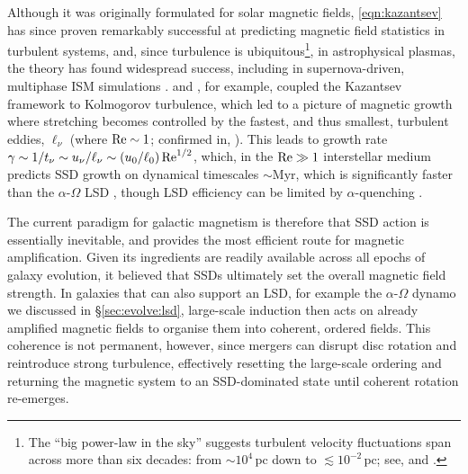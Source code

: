 Although it was originally formulated for solar magnetic fields, \autoref{eqn:kazantsev} has since proven remarkably successful at predicting magnetic field statistics in turbulent systems, and, since turbulence is ubiquitous\footnote{
    The ``big power-law in the sky'' suggests turbulent velocity fluctuations span across more than six decades: from $\sim 10^4\,\mathrm{pc}$ down to $\lesssim 10^{-2}\,\mathrm{pc}$; see, \eg \citet{kalberla2019turbulent} and \citet{liu2025tiny}.
}, in astrophysical plasmas, the theory has found widespread success, including in supernova-driven, multiphase ISM simulations \citep{gent2023transition}. \citet{kulsrud1992spectrum} and \citet{schekochihin2001structure}, for example, coupled the Kazantsev \citep{kazantsev1968} framework to Kolmogorov turbulence, which led to a picture of magnetic growth where stretching becomes controlled by the fastest, and thus smallest, turbulent eddies, $\ell_\nu$ (where $\mathrm{Re} \sim 1$; confirmed in, \eg \citealt{kriel2022fundamental}). This leads to growth rate $\gamma \sim 1 / t_\nu \sim u_\nu/\ell_\nu \sim (u_0 / \ell_0) \,\mathrm{Re}^{1/2}$, which, in the $\mathrm{Re} \gg 1$ interstellar medium predicts SSD growth on dynamical timescales $\sim \mathrm{Myr}$, which is significantly faster than the $\alpha$-$\Omega$ LSD \citep[\eg][]{gent2023transition}, though LSD efficiency can be limited by $\alpha$-quenching \citep{vishniac2001magnetic}.

The current paradigm for galactic magnetism is therefore that SSD action is essentially inevitable, and provides the most efficient route for magnetic amplification. Given its ingredients are readily available across all epochs of galaxy evolution, it believed that SSDs ultimately set the overall magnetic field strength. In galaxies that can also support an LSD, for example the $\alpha$-$\Omega$ dynamo we discussed in \S\ref{sec:evolve:lsd}, large-scale induction then acts on already amplified magnetic fields to organise them into coherent, ordered fields. This coherence is not permanent, however, since mergers can disrupt disc rotation and reintroduce strong turbulence, effectively resetting the large-scale ordering and returning the magnetic system to an SSD-dominated state until coherent rotation re-emerges.
